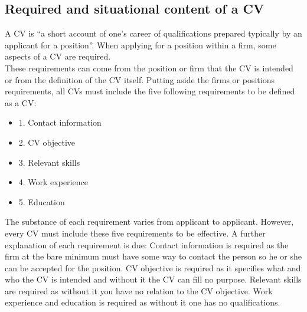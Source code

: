 \subsection{Required and situational content of a CV}
A CV is “a short account of one’s career of qualifications prepared typically by an applicant for a position”.\cite{Difference_between_resume_and_curriculum_Vitae}
When applying for a position within a firm, some aspects of a CV are required. \\
These requirements can come from the position or firm that the CV is intended or from the definition of the CV itself.
Putting aside the firms or positions requirements, all CVs must include the five following requirements to be defined as a CV:
\begin{itemize}
   \item 1. Contact information
   \item 2. CV objective
   \item 3. Relevant skills
   \item 4. Work experience
   \item 5. Education\cite{Write_a_curriculum_Vitae} \\
\end{itemize}
The substance of each requirement varies from applicant to applicant. However, every CV must include these five requirements to be effective.
A further explanation of each requirement is due:
Contact information is required as the firm at the bare minimum must have some way to contact the person so he or she can be accepted for the position.
CV objective is required as it specifies what and who the CV is intended and without it the CV can fill no purpose.
Relevant skills are required as without it you have no relation to the CV objective.
Work experience and education is required as without it one has no qualifications. \\

